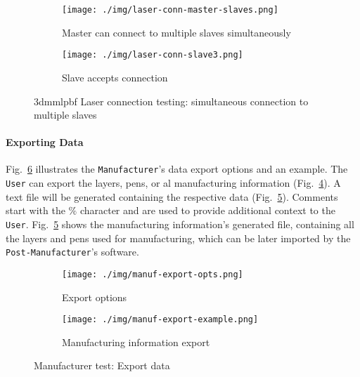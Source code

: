 \begin{figure}[htb!]
  \centering
  \begin{subfigure}[t]{1.0\textwidth}
    \texttt{[image: ./img/laser-conn-master-slaves.png]}
  \caption{Master can connect to multiple slaves simultaneously}%
  \label{fig:laser-conn-multiple-1}
  \end{subfigure}
%
  \begin{subfigure}[t]{1.0\textwidth}
    \texttt{[image: ./img/laser-conn-slave3.png]}
  \caption{Slave accepts connection}%
  \label{fig:laser-conn-multiple-2}
  \end{subfigure}
  \caption{\gls{3dmmlpbf} Laser connection testing: simultaneous connection to
    multiple slaves}%
  \label{fig:laser-conn-multiple}
\end{figure}

\paragraph{Exporting Data}
Fig.~\ref{fig:manuf-export-data} illustrates the \texttt{Manufacturer}'s data
export options and an example. The \texttt{User} can export the layers, pens, or
al manufacturing information (Fig.~\ref{fig:manuf-export-opts}). A text file will be generated containing the
respective data (Fig.~\ref{fig:manuf-export-example}). Comments start with the
$\%$ character and are used to provide additional context to the
\texttt{User}. Fig.~\ref{fig:manuf-export-example} shows the manufacturing
information's generated file, containing all the layers and pens used for
manufacturing, which can be later imported by the \texttt{Post-Manufacturer}'s software.

\begin{figure}[htbp!]
  \centering
  \begin{subfigure}[t]{0.4\textwidth}
  \centering
  \texttt{[image: ./img/manuf-export-opts.png]}
  \caption{Export options}%
  \label{fig:manuf-export-opts}
  \end{subfigure}
%
  \begin{subfigure}[t]{0.58\textwidth}
  \centering
  \texttt{[image: ./img/manuf-export-example.png]}
  \caption{Manufacturing information export}%
  \label{fig:manuf-export-example}
\end{subfigure}
  \caption{Manufacturer test: Export data}%
  \label{fig:manuf-export-data}
\end{figure}

